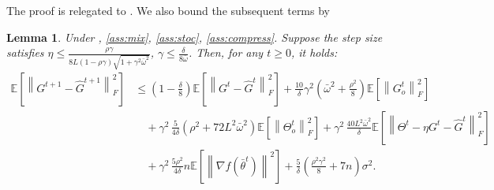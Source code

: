 \documentclass[10pt]{article} %
\theoremstyle{plain}
\newtheorem{lemma}[theorem]{Lemma}
\theoremstyle{definition}
\theoremstyle{remark}
\newcommand{\prm}{\theta}
\newcommand{\bw}{\bar{\omega}}
\newcommand{\avgtheta}{\bar{\prm}}
\newcommand{\norm}[1]{\left\| #1 \right\|}
\newcommand{\nl}{\nonumber\\}
\begin{document}
The proof is relegated to . We also bound the subsequent terms by
\begin{lemma} \label{lem:gt}
    Under , \ref{ass:mix}, \ref{ass:stoc}, \ref{ass:compress}. Suppose the step size satisfies $\eta \leq \frac{ \rho \gamma }{ 8L (1-\rho\gamma) \sqrt{1 + \gamma^2 \bw^2} }$, $\gamma \leq \frac{\delta}{8 \bw}$. Then, for any $t \geq 0$, it holds:
    \begin{align*}
    \mathbb{E} \left[ \norm{ G^{t+1} - \hat{G}^{t+1} }_F^2 \right] & \leq \left(1 - \frac{\delta}{8} \right) \mathbb{E} \left[ \norm{ G^{t} - \hat{G}^{t} }_F^2 \right] + \frac{10}{\delta} \gamma^2 \left( \bw^2 + \frac{\rho^2 }{8} \right) \mathbb{E} \left[ \norm{G_o^t}_F^2 \right] \nl 
    & \quad + \gamma^2 \, \frac{5}{4 \delta} \left( \rho^2 + 72 L^2 \bw^2 \right) \mathbb{E} \left[ \norm{\Theta_o^t}_F^2 \right] + \gamma^2 \, \frac{40 L^2 \bw^2}{\delta} \mathbb{E} \left[ \norm{ \Theta^t - \eta G^t - \hat{G}^t }_F^2 \right] \nl
    & \quad + \gamma^2 \, \frac{5 \rho^2}{4 \delta} n \mathbb{E} \left[ \norm{\nabla f(\avgtheta^t)}^2 \right]  + \frac{5}{\delta} \left( \frac{\rho^2 \gamma^2}{8} + 7 n \right) \sigma^2.
    \end{align*}
    \end{lemma}
\end{document}
